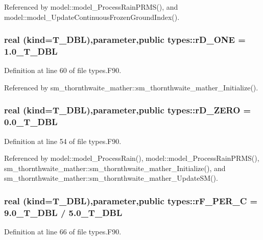 Referenced by model::model\_\-ProcessRainPRMS(), and model::model\_\-UpdateContinuousFrozenGroundIndex().

\hypertarget{namespacetypes_a90dcad5fbd0123e675aed418b5b421cf}{
\subsubsection[{rD\_\-ONE}]{\setlength{\rightskip}{0pt plus 5cm}real (kind={\bf T\_\-DBL}),parameter,public {\bf types::rD\_\-ONE} = 1.0\_\-T\_\-DBL}}
\label{namespacetypes_a90dcad5fbd0123e675aed418b5b421cf}


Definition at line 60 of file types.F90.



Referenced by sm\_\-thornthwaite\_\-mather::sm\_\-thornthwaite\_\-mather\_\-Initialize().

\hypertarget{namespacetypes_af4d6e7a6f7dfdf6df6fa94bcd6af757f}{
\subsubsection[{rD\_\-ZERO}]{\setlength{\rightskip}{0pt plus 5cm}real (kind={\bf T\_\-DBL}),parameter,public {\bf types::rD\_\-ZERO} = 0.0\_\-T\_\-DBL}}
\label{namespacetypes_af4d6e7a6f7dfdf6df6fa94bcd6af757f}


Definition at line 54 of file types.F90.



Referenced by model::model\_\-ProcessRain(), model::model\_\-ProcessRainPRMS(), sm\_\-thornthwaite\_\-mather::sm\_\-thornthwaite\_\-mather\_\-Initialize(), and sm\_\-thornthwaite\_\-mather::sm\_\-thornthwaite\_\-mather\_\-UpdateSM().

\hypertarget{namespacetypes_a663b1a3284266c4c5cdbcfb63753f352}{
\subsubsection[{rF\_\-PER\_\-C}]{\setlength{\rightskip}{0pt plus 5cm}real (kind={\bf T\_\-DBL}),parameter,public {\bf types::rF\_\-PER\_\-C} = 9.0\_\-T\_\-DBL / 5.0\_\-T\_\-DBL}}
\label{namespacetypes_a663b1a3284266c4c5cdbcfb63753f352}


Definition at line 66 of file types.F90.




